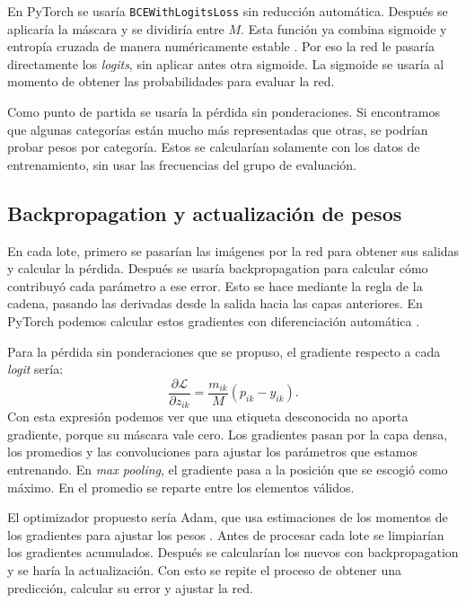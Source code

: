 \documentclass[eng]{ajceam-class}
\begin{document}
En PyTorch se usaría \texttt{BCEWithLogitsLoss} sin reducción automática. Después se aplicaría la máscara y se dividiría entre $M$. Esta función ya combina sigmoide y entropía cruzada de manera numéricamente estable \cite{torchbce}. Por eso la red le pasaría directamente los \textit{logits}, sin aplicar antes otra sigmoide. La sigmoide se usaría al momento de obtener las probabilidades para evaluar la red.

Como punto de partida se usaría la pérdida sin ponderaciones. Si encontramos que algunas categorías están mucho más representadas que otras, se podrían probar pesos por categoría. Estos se calcularían solamente con los datos de entrenamiento, sin usar las frecuencias del grupo de evaluación.

\subsection{Backpropagation y actualización de pesos}

En cada lote, primero se pasarían las imágenes por la red para obtener sus salidas y calcular la pérdida. Después se usaría backpropagation para calcular cómo contribuyó cada parámetro a ese error. Esto se hace mediante la regla de la cadena, pasando las derivadas desde la salida hacia las capas anteriores. En PyTorch podemos calcular estos gradientes con diferenciación automática \cite{torchautograd}.

Para la pérdida sin ponderaciones que se propuso, el gradiente respecto a cada \textit{logit} sería:
\begin{equation}
\frac{\partial\mathcal{L}}{\partial z_{ik}}
=\frac{m_{ik}}{M}(p_{ik}-y_{ik}).
\end{equation}
Con esta expresión podemos ver que una etiqueta desconocida no aporta gradiente, porque su máscara vale cero. Los gradientes pasan por la capa densa, los promedios y las convoluciones para ajustar los parámetros que estamos entrenando. En \textit{max pooling}, el gradiente pasa a la posición que se escogió como máximo. En el promedio se reparte entre los elementos válidos.

El optimizador propuesto sería Adam, que usa estimaciones de los momentos de los gradientes para ajustar los pesos \cite{torchadam}. Antes de procesar cada lote se limpiarían los gradientes acumulados. Después se calcularían los nuevos con backpropagation y se haría la actualización. Con esto se repite el proceso de obtener una predicción, calcular su error y ajustar la red.
\end{document}
